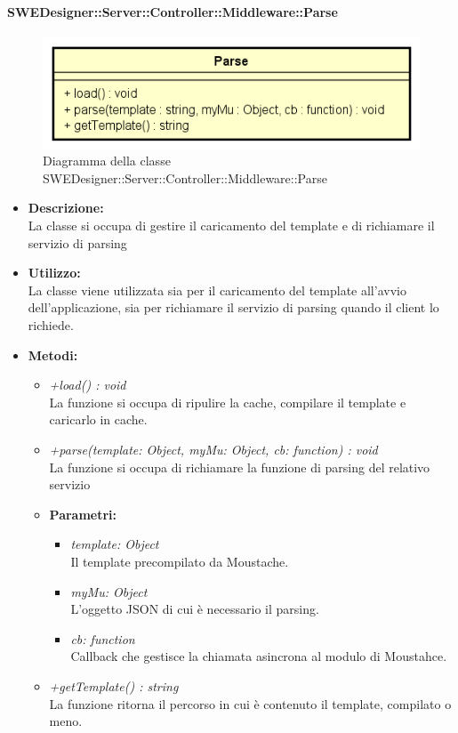       \paragraph{SWEDesigner::Server::Controller::Middleware::Parse}
      	\begin{figure}[h!]
		\centering
		\includegraphics[scale=0.8]{Classi/Parse.png}
		\caption{Diagramma della classe SWEDesigner::Server::Controller::Middleware::Parse}
 		\end{figure}
        \begin{itemize}
          \item \textbf{Descrizione: }\\
          La classe si occupa di gestire il caricamento del template e di richiamare il servizio di parsing
          \item \textbf{Utilizzo: }\\
          La classe viene utilizzata sia per il caricamento del template all'avvio dell'applicazione, sia per richiamare il servizio di parsing quando il client lo richiede.
          \item \textbf{Metodi: }\\
          \begin{itemize}
            \item \emph{+load() : void}\\
            La funzione si occupa di ripulire la cache, compilare il template e caricarlo in cache.
            \item \emph{+parse(template: Object, myMu: Object, cb: function) : void}\\
            La funzione si occupa di richiamare la funzione di parsing del relativo servizio
            \item \textbf{Parametri: }\\
            \begin{itemize}
              \item \emph{template: Object}\\
              Il template precompilato da Moustache.
              \item \emph{myMu: Object}\\
              L'oggetto JSON di cui è necessario il parsing.
              \item \emph{cb: function}\\
              Callback che gestisce la chiamata asincrona al modulo di Moustahce.
            \end{itemize}
            \item \emph{+getTemplate() : string}\\
            La funzione ritorna il percorso in cui è contenuto il template, compilato o meno.
          \end{itemize}
        \end{itemize}
